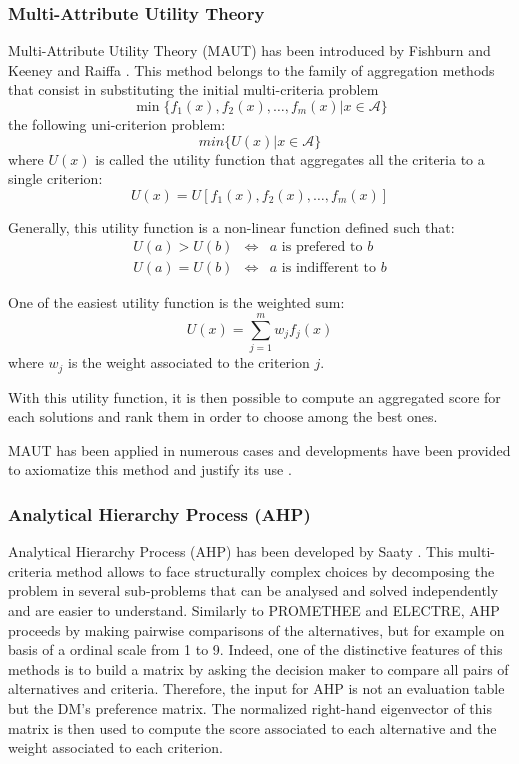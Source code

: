 \subsubsection{Multi-Attribute Utility Theory}
Multi-Attribute Utility Theory (MAUT) has been introduced by Fishburn \cite{Fishburn70} and Keeney and Raiffa \cite{KeeneyRaiffa76}. This method belongs to the family of aggregation methods that consist in substituting the initial multi-criteria problem
\begin{equation}
\min \{f_1(x), f_2(x), \dots, f_m(x) | x \in \mathcal{A}\}
\end{equation}
the following uni-criterion problem:
\begin{equation}
min \{U(x) | x \in \mathcal{A}\}
\end{equation}
where $U(x)$ is called the utility function that aggregates all the criteria to a single criterion:
\begin{equation}
U(x) = U[f_1(x), f_2(x), \dots, f_m(x)]
\end{equation}

Generally, this utility function is a non-linear function defined such that:
\begin{eqnarray}
U(a) > U(b) &\Leftrightarrow& a \text{ is prefered to } b\\
U(a) = U(b) &\Leftrightarrow& a \text{ is indifferent to } b
\end{eqnarray}

One of the easiest utility function is the weighted sum:
\begin{equation}
U(x) = \sum_{j=1}^{m} w_j f_j(x)
\end{equation}
where $w_j$ is the weight associated to the criterion $j$.

With this utility function, it is then possible to compute an aggregated score for each solutions and rank them in order to choose among the best ones.

MAUT has been applied in numerous cases and developments have been provided to axiomatize this method and justify its use \cite{MMAUT}.

\subsubsection{Analytical Hierarchy Process (AHP)}
Analytical Hierarchy Process (AHP) has been developed by Saaty \cite{MAHP}. This multi-criteria method allows to face structurally complex choices by decomposing the problem in several sub-problems that can be analysed and solved independently and are easier to understand. Similarly to PROMETHEE and ELECTRE, AHP proceeds by making pairwise comparisons of the alternatives, but for example on basis of a ordinal scale from 1 to 9. Indeed, one of the distinctive features of this methods is to build a matrix by asking the decision maker to compare all pairs of alternatives and criteria. Therefore, the input for AHP is not an evaluation table but the DM's preference matrix. The normalized right-hand eigenvector of this matrix is then used to compute the score associated to each alternative and the weight associated to each criterion. 


